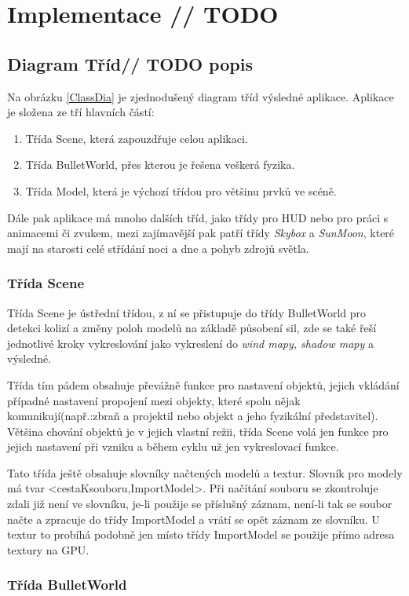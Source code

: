 \chapter{Implementace \label{implementace}// TODO}
\section{Diagram Tříd// TODO popis}
Na obrázku \ref{ClassDia} je zjednodušený diagram tříd výsledné aplikace. Aplikace je složena ze tří hlavních částí:
\begin{enumerate}
	\item Třída Scene, která zapouzdřuje celou aplikaci.
	\item Třída BulletWorld, přes kterou je řešena veškerá fyzika.
	\item Třída Model, která je výchozí třídou pro většinu prvků ve scéně.
\end{enumerate} 
Dále pak aplikace má mnoho dalších tříd, jako třídy pro HUD nebo pro práci s animacemi či zvukem, mezi zajímavější pak patří třídy \emph{Skybox} a \emph{SunMoon}, které mají na starosti celé střídání noci a dne a pohyb zdrojů světla. 
\subsection{Třída Scene}
Třída Scene je ústřední třídou, z ní se přistupuje do třídy BulletWorld pro detekci kolizí a změny poloh modelů na základě působení sil, zde se také řeší jednotlivé kroky vykreslování jako vykreslení do \emph{wind mapy, shadow mapy} a výsledné.

Třída tím pádem obsahuje převážně funkce pro nastavení objektů, jejich vkládání případné nastavení propojení mezi objekty, které spolu nějak komunikují(např.:zbraň a projektil nebo objekt a jeho fyzikální představitel). Většina chování objektů je v jejich vlastní režii, třída Scene volá jen funkce pro jejich nastavení při vzniku a během cyklu už jen vykreslovací funkce.  

Tato třída ještě obsahuje slovníky načtených modelů a textur. Slovník pro modely má tvar <cestaKsouboru,ImportModel>. Při načítání souboru se zkontroluje zdali již není ve slovníku, je-li použije se příslušný záznam, není-li tak se soubor načte a zpracuje do třídy ImportModel a vrátí se opět záznam ze slovníku. U textur to probíhá podobně jen místo třídy ImportModel se použije přímo adresa textury na GPU.
\subsection{Třída BulletWorld}
  
